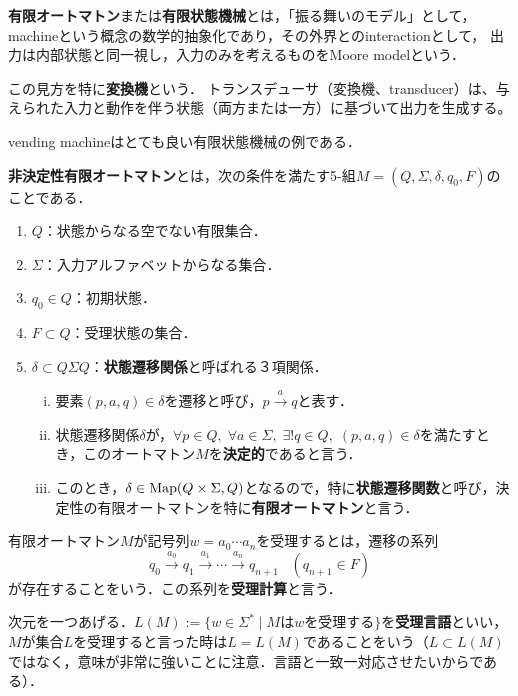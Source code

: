 \documentclass[uplatex, 12pt, dvipdfmx]{jsreport}
\begin{document}
\begin{definition}
    \textbf{有限オートマトン}または\textbf{有限状態機械}とは，「振る舞いのモデル」として，machineという概念の数学的抽象化であり，その外界とのinteractionとして，
    出力は内部状態と同一視し，入力のみを考えるものをMoore modelという．

    この見方を特に\textbf{変換機}という．
    トランスデューサ（変換機、transducer）は、与えられた入力と動作を伴う状態（両方または一方）に基づいて出力を生成する。
\end{definition}
\begin{example}
    vending machineはとても良い有限状態機械の例である．
\end{example}

\begin{definition}
    \textbf{非決定性有限オートマトン}とは，次の条件を満たす5-組$M=(Q,\Sigma,\delta,q_0,F)$のことである．
    \begin{enumerate}
        \item $Q$：状態からなる空でない有限集合．
        \item $\Sigma$：入力アルファベットからなる集合．
        \item $q_0\in Q$：初期状態．
        \item $F\subset Q$：受理状態の集合．
        \item $\delta\subset Q\Sigma Q$：\textbf{状態遷移関係}と呼ばれる３項関係．
        \begin{enumerate}[(i)]
            \item 要素$(p,a,q)\in\delta$を遷移と呼び，$p\xrightarrow{a}q$と表す．
            \item 状態遷移関係$\delta$が，$\forall p\in Q,\;\forall a\in\Sigma,\;\exists!q\in Q,\;(p,a,q)\in\delta$を満たすとき，このオートマトン$M$を\textbf{決定的}であると言う．
            \item このとき，$\delta\in\mathrm{Map}(Q\times\Sigma,Q)$となるので，特に\textbf{状態遷移関数}と呼び，決定性の有限オートマトンを特に\textbf{有限オートマトン}と言う．
        \end{enumerate}
    \end{enumerate}
\end{definition}

\begin{definition}
    有限オートマトン$M$が記号列$w=a_0\cdots a_n$を受理するとは，遷移の系列
    \[ q_0\xrightarrow{a_0}q_1\xrightarrow{a_1}\cdots\xrightarrow{a_n}q_{n+1}\;\;\;(q_{n+1}\in F) \]
    が存在することをいう．この系列を\textbf{受理計算}と言う．

    次元を一つあげる．$L(M):=\{w\in\Sigma^*\mid Mはwを受理する\}$を\textbf{受理言語}といい，
    $M$が集合$L$を受理すると言った時は$L=L(M)$であることをいう（$L\subset L(M)$ではなく，意味が非常に強いことに注意．言語と一致一対応させたいからである）．
\end{definition}
\end{document}
